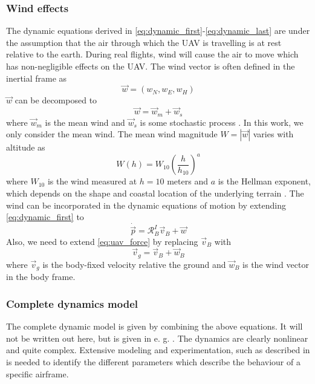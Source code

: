 \subsubsection{Wind effects}
The dynamic equations derived in \eqref{eq:dynamic_first}-\eqref{eq:dynamic_last} are under
the assumption that the air through which the UAV is travelling is at rest relative to the earth.
During real flights, wind will cause the air to move which has non-negligible effects on the UAV.
The wind vector is often defined in the inertial frame as
\begin{equation}
    \vec{w}=(w_N, w_E, w_H)
\end{equation}
$\vec{w}$ can be decomposed to
\begin{equation}
    \vec{w}=\vec{w}_{m}+\vec{w}_s
\end{equation}
where $\vec{w}_m$ is the mean wind and $\vec{w}_s$ is some stochastic process \cite{spline_trajectory}. In this work,
we only consider the mean wind.
The mean wind magnitude $W=|\vec{w}|$ varies with altitude as
\begin{equation}
    W(h)=W_{10}(\frac{h}{h_{10}})^a
\end{equation}
where $W_{10}$ is the wind measured at $h=10$ meters and $a$ is the Hellman exponent, which depends on
the shape and coastal location of the underlying terrain \cite{uav_dynamics_wind}. The wind can be 
incorporated in the dynamic equations of motion by extending \eqref{eq:dynamic_first} to
\begin{equation}
    \dot{\vec{p}}=\mathcal{R}^I_B\vec{v}_B+\vec{w}
\end{equation}
Also, we need to extend \eqref{eq:uav_force} by replacing $\vec{v}_B$ with
\begin{equation}
    \vec{v}_g = \vec{v}_B + \vec{w}_B
\end{equation} 
where $\vec{v}_g$ is the body-fixed velocity relative the ground and $\vec{w}_B$ is the
wind vector in the body frame.

\subsubsection{Complete dynamics model}
The complete dynamic model is given by combining the above equations. It will not be 
written out here, but is given in e. g. \cite{uav_dynamics_wind}. The dynamics are clearly nonlinear and quite complex. Extensive modeling and experimentation, such as described in \cite{aerodynamic_parameters}
is needed to identify the different parameters which describe the behaviour of a specific airframe.

